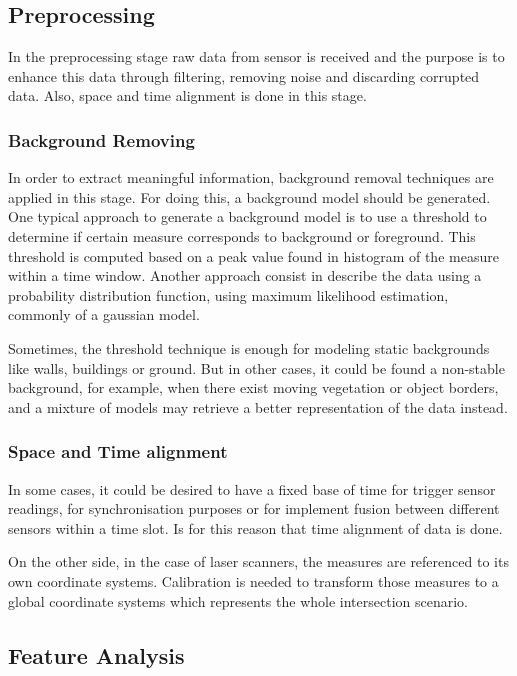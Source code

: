 \documentclass[10pt,twocolumn,letterpaper]{article}
\begin{document}
\subsection{Preprocessing}

 In the preprocessing stage raw data from sensor is received and the purpose is to enhance this data through filtering, removing noise and discarding corrupted data. Also, space and time alignment is done in this stage.

\subsubsection{Background Removing}
 
In order to extract meaningful information, background removal techniques are applied in this stage. For doing this, a background model should be generated. One typical approach to generate a background model is to use a threshold to determine if certain measure corresponds to background or foreground. This threshold is computed based on a peak value found in histogram of the measure within a time window. Another approach consist in describe the data using a probability distribution function, using maximum likelihood estimation, commonly of a gaussian model.
 
Sometimes, the threshold technique is enough for modeling static backgrounds like walls, buildings or ground. But in other cases, it could be found a non-stable background, for example, when there exist moving vegetation or object borders, and a mixture of models may retrieve a better representation of the data instead.

\subsubsection{Space and Time alignment}

In some cases, it could be desired to have a fixed base of time for trigger sensor readings, for synchronisation purposes or for implement fusion between different sensors within a time slot. Is for this reason that time alignment of data is done.

On the other side, in the case of laser scanners, the measures are referenced to its own coordinate systems. Calibration is needed to transform those measures to a global coordinate systems which represents the whole intersection scenario. 

\subsection{Feature Analysis}
\end{document}
